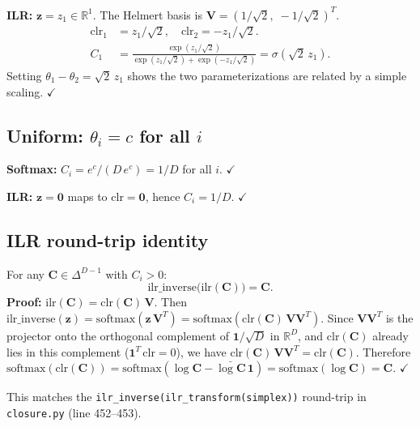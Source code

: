 \documentclass[11pt]{article}
\newcommand{\CC}{\mathbf{C}}
\newcommand{\zz}{\mathbf{z}}
\newcommand{\VV}{\mathbf{V}}
\newcommand{\ones}{\mathbf{1}}
\begin{document}
\textbf{ILR:}
$\zz = z_1 \in \mathbb{R}^1$.  The Helmert basis is
$\VV = (1/\sqrt{2},\;-1/\sqrt{2})^T$.
%
\begin{align}
  \mathrm{clr}_1 &= z_1/\sqrt{2}, \quad
  \mathrm{clr}_2 = -z_1/\sqrt{2}. \nonumber\\
  C_1 &= \frac{\exp(z_1/\sqrt{2})}{\exp(z_1/\sqrt{2}) + \exp(-z_1/\sqrt{2})}
       = \sigma(\sqrt{2}\,z_1).
\end{align}
%
Setting $\theta_1 - \theta_2 = \sqrt{2}\,z_1$ shows the two
parameterizations are related by a simple scaling. $\checkmark$

\subsection{Uniform: $\theta_i = c$ for all $i$}

\textbf{Softmax:}
$C_i = e^c / (D\,e^c) = 1/D$ for all $i$. $\checkmark$

\textbf{ILR:}
$\zz = \mathbf{0}$ maps to $\mathrm{clr} = \mathbf{0}$, hence
$C_i = 1/D$. $\checkmark$

\subsection{ILR round-trip identity}

For any $\CC \in \Delta^{D-1}$ with $C_i > 0$:
%
\begin{equation}
  \mathrm{ilr\_inverse}\bigl(\mathrm{ilr}(\CC)\bigr) = \CC.
\end{equation}
%
\textbf{Proof:}
$\mathrm{ilr}(\CC) = \mathrm{clr}(\CC)\,\VV$.
Then $\mathrm{ilr\_inverse}(\zz) = \mathrm{softmax}(\zz\,\VV^T)
= \mathrm{softmax}(\mathrm{clr}(\CC)\,\VV\VV^T)$.
Since $\VV\VV^T$ is the projector onto the orthogonal complement of
$\ones/\sqrt{D}$ in $\mathbb{R}^D$, and $\mathrm{clr}(\CC)$ already lies
in this complement ($\ones^T\,\mathrm{clr} = 0$), we have
$\mathrm{clr}(\CC)\,\VV\VV^T = \mathrm{clr}(\CC)$.
Therefore
$\mathrm{softmax}(\mathrm{clr}(\CC)) = \mathrm{softmax}(\log\CC - \bar{\log\CC}\,\ones)
= \mathrm{softmax}(\log\CC) = \CC$.
$\checkmark$

This matches the \texttt{ilr\_inverse(ilr\_transform(simplex))} round-trip
in \texttt{closure.py} (line 452--453).

\end{document}
